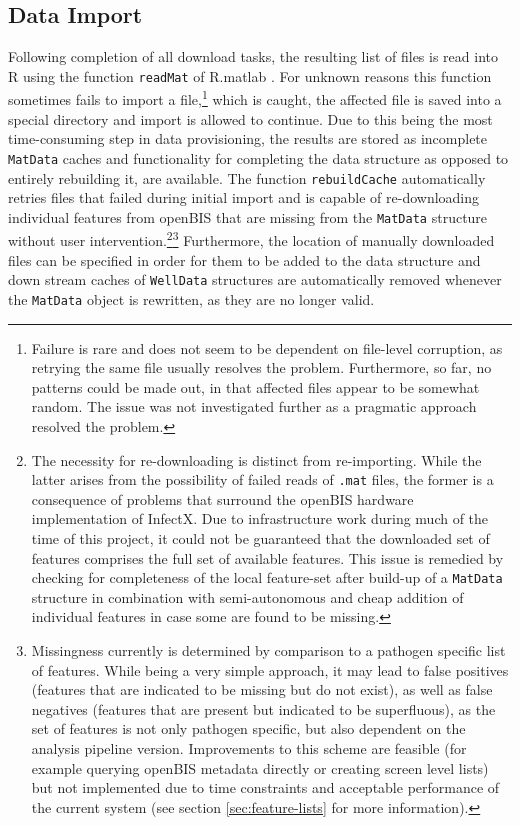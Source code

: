 \subsection{Data Import}
Following completion of all download tasks, the resulting list of files is read into R using the function \texttt{readMat} of R.matlab \citep{Bengtsson2015}. For unknown reasons this function sometimes fails to import a file,\footnote{Failure is rare and does not seem to be dependent on file-level corruption, as retrying the same file usually resolves the problem. Furthermore, so far, no patterns could be made out, in that affected files appear to be somewhat random. The issue was not investigated further as a pragmatic approach resolved the problem.} which is caught, the affected file is saved into a special directory and import is allowed to continue. Due to this being the most time-consuming step in data provisioning, the results are stored as incomplete \texttt{MatData} caches and functionality for completing the data structure as opposed to entirely rebuilding it, are available. The function \texttt{rebuildCache} automatically retries files that failed during initial import and is capable of re-downloading individual features from openBIS that are missing from the \texttt{MatData} structure without user intervention.\footnote{The necessity for re-downloading is distinct from re-importing. While the latter arises from the possibility of failed reads of \texttt{.mat} files, the former is a consequence of problems that surround the openBIS hardware implementation of InfectX. Due to infrastructure work during much of the time of this project, it could not be guaranteed that the downloaded set of features comprises the full set of available features. This issue is remedied by checking for completeness of the local feature-set after build-up of a \texttt{MatData} structure in combination with semi-autonomous and cheap addition of individual features in case some are found to be missing.}\footnote{\label{fn:feat-check}Missingness currently is determined by comparison to a pathogen specific list of features. While being a very simple approach, it may lead to false positives (features that are indicated to be missing but do not exist), as well as false negatives (features that are present but indicated to be superfluous), as the set of features is not only pathogen specific, but also dependent on the analysis pipeline version. Improvements to this scheme are feasible (for example querying openBIS metadata directly or creating screen level lists) but not implemented due to time constraints and acceptable performance of the current system (see section \ref{sec:feature-lists} for more information).} Furthermore, the location of manually downloaded files can be specified in order for them to be added to the data structure and down stream caches of \texttt{WellData} structures are automatically removed whenever the \texttt{MatData} object is rewritten, as they are no longer valid.

